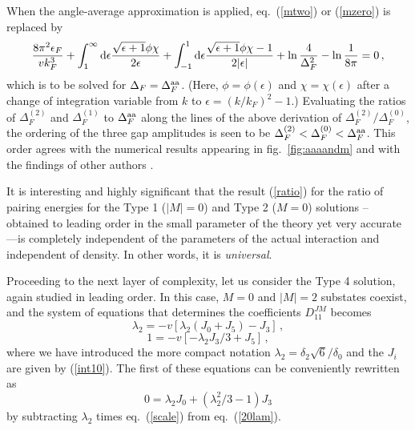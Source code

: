 When the angle-average approximation is applied, eq.~(\ref{mtwo})
or (\ref{mzero}) is replaced by
\begin{equation}
\frac{8\pi^2\epsilon_F}{v k^3_F} 
	+ \int_{1}^\infty {\rm d} \epsilon
	\frac{\sqrt{\epsilon+1}\phi\chi}{2\epsilon}
	+ \int^{1}_{-1}{\rm d}\epsilon
		\frac{\sqrt{\epsilon+1}\phi\chi-1}{2|\epsilon|}
	+ \ln \frac4{\Delta^2_F} - \ln \frac1{8\pi} = 0 \, ,
\label{aaa0}
\end{equation}
which is to be solved for $\Delta_F = \Delta_F^{\rm aa}$.
(Here, $\phi=\phi(\epsilon)$ and $\chi=\chi(\epsilon)$ after
a change of integration variable from $k$ to $\epsilon=(k/k_F)^2-1$.)
Evaluating the ratios of $\Delta_F^{(2)}$ and $\Delta_F^{(1)}$
to $\Delta_F^{\rm aa}$ along the lines of the above derivation of
$\Delta_F^{(2)}/\Delta_F^{(0)}$, the ordering of the three
gap amplitudes is seen to be $\Delta_F^{(2)} < \Delta_F^{(0)}
< \Delta_F^{\rm aa}$.  This order agrees with the numerical results 
appearing in fig.~\ref{fig:aaaandm} and with the findings of other
authors \cite{tt71,ttr,ostgaard}.

It is interesting and highly significant that the result (\ref{ratio}) 
for the ratio of pairing energies for the Type 1 ($|M|=0$) and Type 2 
($M=0$) solutions -- obtained to leading order in the small parameter 
of the theory yet very accurate---is completely independent of the 
parameters of the actual interaction and independent of density.
In other words, it is {\it universal}.

Proceeding to the next layer of complexity, let us consider the
Type 4 solution, again studied in leading order.  In this case,
$M=0$ and $|M|=2$ substates coexist, and the system of equations
that determines the coefficients $D_{11}^{JM}$ becomes
\begin{equation}
\lambda_2=-v\left[\lambda_2(J_0+J_5)-J_3\right] \, , \label{20lam}
\end{equation}
\begin{equation}
1=-v\left[-\lambda_2J_3/3+J_5\right] \, ,
\label{scale}
\end{equation}
where we have introduced the more compact notation
$\lambda_2=\delta_2\sqrt{6}/\delta_0$ and the $J_i$ are given
by (\ref{int10}). The first of these equations can be conveniently
rewritten as
\begin{equation}
0=\lambda_2J_0+(\lambda^2_2/3-1)J_3
\label{dif}
\end{equation}
by subtracting $\lambda_2$ times eq.~(\ref{scale}) from
eq.~(\ref{20lam}).

